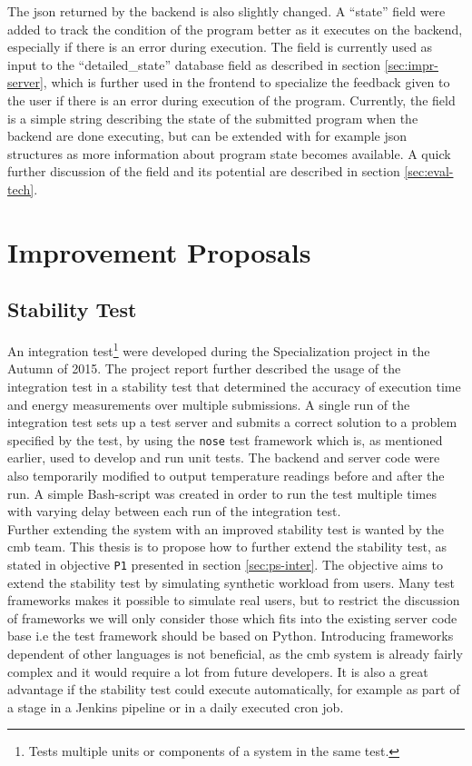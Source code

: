 The \gls{json} returned by the backend is also slightly changed. A ``state'' field were added to track the condition of the program better as it executes on the backend, especially if there is an error during execution. The field is currently used as input to the ``detailed\_state'' database field as described in section \ref{sec:impr-server}, which is further used in the frontend to specialize the feedback given to the user if there is an error during execution of the program. Currently, the field is a simple string describing the state of the submitted program when the backend are done executing, but can be extended with for example \gls{json} structures as more information about program state becomes available. A quick further discussion of the field and its potential are described in section \ref{sec:eval-tech}.

\section{Improvement Proposals}

\subsection{Stability Test}
An integration test\footnote{Tests multiple units or components of a system in the same test.} were developed during the Specialization project in the Autumn of 2015. The project report further described the usage of the integration test in a stability test that determined the accuracy of execution time and energy measurements over multiple submissions. A single run of the integration test sets up a test server and submits a correct solution to a problem specified by the test, by using the \texttt{nose} test framework which is, as mentioned earlier, used to develop and run unit tests. The backend and server code were also temporarily modified to output temperature readings before and after the run. A simple Bash-script was created in order to run the test multiple times with varying delay between each run of the integration test. \\

Further extending the system with an improved stability test is wanted by the \gls{cmb} team. This thesis is to propose how to further extend the stability test, as stated in objective \texttt{P1} presented in section \ref{sec:ps-inter}. The objective aims to extend the stability test by simulating synthetic workload from users. Many test frameworks makes it possible to simulate real users, but to restrict the discussion of frameworks we will only consider those which fits into the existing server code base i.e the test framework should be based on Python. Introducing frameworks dependent of other languages is not beneficial, as the \gls{cmb} system is already fairly complex and it would require a lot from future developers. It is also a great advantage if the stability test could execute automatically, for example as part of a stage in a Jenkins pipeline or in a daily executed cron job. \\

